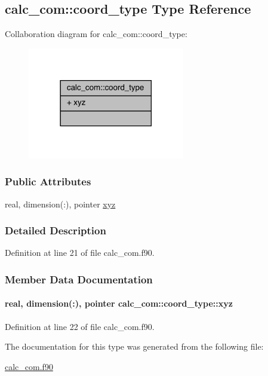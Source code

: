 \hypertarget{structcalc__com_1_1coord__type}{\subsection{calc\-\_\-com\-:\-:coord\-\_\-type Type Reference}
\label{structcalc__com_1_1coord__type}
}


Collaboration diagram for calc\-\_\-com\-:\-:coord\-\_\-type\-:
\nopagebreak
\begin{figure}[H]
\begin{center}
\leavevmode
\includegraphics[width=194pt]{structcalc__com_1_1coord__type__coll__graph}
\end{center}
\end{figure}
\subsubsection*{Public Attributes}
\begin{DoxyCompactItemize}
\item 
real, dimension(\-:), pointer \hyperlink{structcalc__com_1_1coord__type_aa0cc5cd48f357ce7b0b97dc15d396000}{xyz}
\end{DoxyCompactItemize}


\subsubsection{Detailed Description}


Definition at line 21 of file calc\-\_\-com.\-f90.



\subsubsection{Member Data Documentation}
\hypertarget{structcalc__com_1_1coord__type_aa0cc5cd48f357ce7b0b97dc15d396000}{
\paragraph[{xyz}]{\setlength{\rightskip}{0pt plus 5cm}real, dimension(\-:), pointer calc\-\_\-com\-::coord\-\_\-type\-::xyz}}\label{structcalc__com_1_1coord__type_aa0cc5cd48f357ce7b0b97dc15d396000}


Definition at line 22 of file calc\-\_\-com.\-f90.



The documentation for this type was generated from the following file\-:\begin{DoxyCompactItemize}
\item 
\hyperlink{calc__com_8f90}{calc\-\_\-com.\-f90}\end{DoxyCompactItemize}
